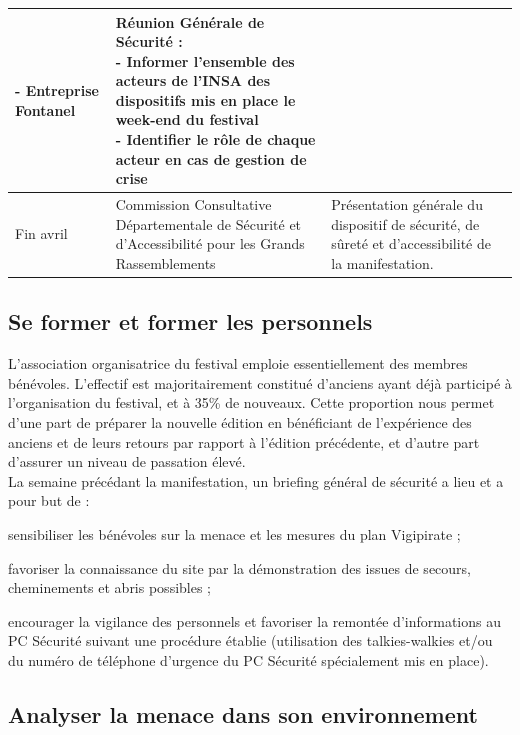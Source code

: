 \documentclass[hidelinks, paper=a4, fontsize=13pt]{report}
\begin{document}
\begin{center}
\begin{tabular}{| p{2cm} | p{5.5cm} | p{8cm} |}
{  - Entreprise Fontanel\\}  & 
  \parbox[t]{8cm}{Réunion Générale de Sécurité :\\
  - Informer l'ensemble des acteurs de l'INSA des dispositifs mis en place le week-end du festival\\
  - Identifier le rôle de chaque acteur en cas de gestion de crise}
 \\
 \hline
  Fin avril &
  \parbox[t]{5.5cm}{Commission Consultative Départementale de Sécurité et d’Accessibilité pour les Grands Rassemblements} & 
  \parbox[t]{8cm}{Présentation générale du dispositif de sécurité, de sûreté et d'accessibilité de la manifestation.}
 \\
 \hline 
 
\end{tabular}
\end{center}

\subsection{Se former et former les personnels}

L’association organisatrice du festival emploie essentiellement des membres bénévoles. L’effectif est majoritairement constitué d’anciens ayant déjà participé à l’organisation du festival, et à 35\% de nouveaux. Cette proportion nous permet d’une part de préparer la nouvelle édition en bénéficiant de l'expérience des anciens et de leurs retours par rapport à l'édition précédente, et d’autre part d’assurer un niveau de passation élevé.\\

La semaine précédant la manifestation, un briefing général de sécurité a lieu et a pour but de :
\begin{list}{•}{}
	\item sensibiliser les bénévoles sur la menace et les mesures du plan Vigipirate ;
	\item favoriser la connaissance du site par la démonstration des issues de secours, cheminements et abris possibles ;
	\item encourager la vigilance des personnels et favoriser la remontée d’informations au PC Sécurité suivant une procédure établie (utilisation des talkies-walkies et/ou du numéro de téléphone d’urgence du PC Sécurité spécialement mis en place).
\end{list}

\subsection{Analyser la menace dans son environnement}
\end{document}
